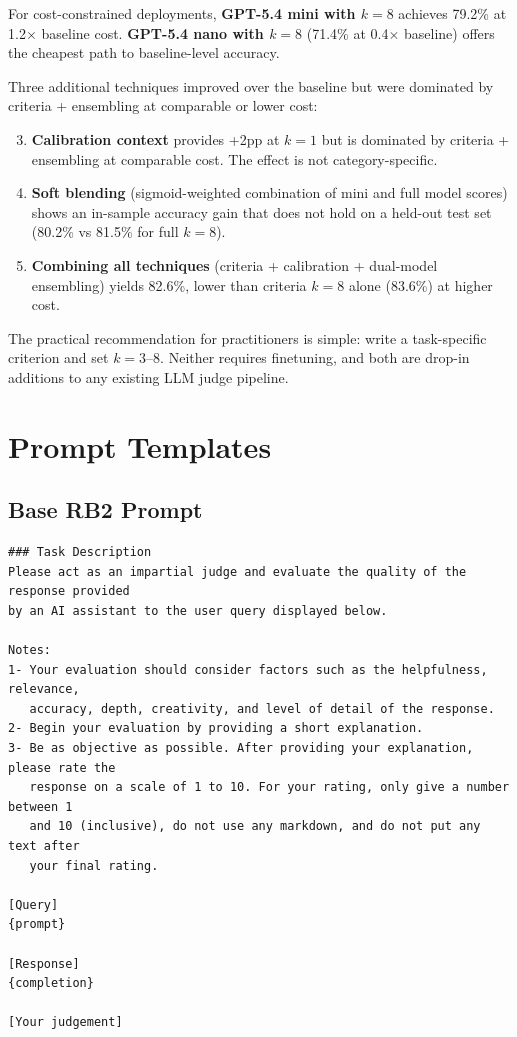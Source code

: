 \documentclass{article}
\begin{document}
For cost-constrained deployments, \textbf{GPT-5.4 mini with $k{=}8$} achieves 79.2\% at 1.2$\times$ baseline cost. \textbf{GPT-5.4 nano with $k{=}8$} (71.4\% at 0.4$\times$ baseline) offers the cheapest path to baseline-level accuracy.

Three additional techniques improved over the baseline but were dominated by criteria + ensembling at comparable or lower cost:

\begin{enumerate}
  \setcounter{enumi}{2}
  \item \textbf{Calibration context} provides +2pp at $k{=}1$ but is dominated by criteria + ensembling at comparable cost. The effect is not category-specific.
  \item \textbf{Soft blending} (sigmoid-weighted combination of mini and full model scores) shows an in-sample accuracy gain that does not hold on a held-out test set (80.2\% vs 81.5\% for full $k{=}8$).
  \item \textbf{Combining all techniques} (criteria + calibration + dual-model ensembling) yields 82.6\%, lower than criteria $k{=}8$ alone (83.6\%) at higher cost.
\end{enumerate}

The practical recommendation for practitioners is simple: write a task-specific criterion and set $k{=}3$--$8$. Neither requires finetuning, and both are drop-in additions to any existing LLM judge pipeline.

\FloatBarrier



\appendix
\section{Prompt Templates}
\label{sec:prompts}

\subsection{Base RB2 Prompt}
\label{sec:prompt-base}

\begin{lstlisting}[style=prompt]
### Task Description
Please act as an impartial judge and evaluate the quality of the response provided
by an AI assistant to the user query displayed below.

Notes:
1- Your evaluation should consider factors such as the helpfulness, relevance,
   accuracy, depth, creativity, and level of detail of the response.
2- Begin your evaluation by providing a short explanation.
3- Be as objective as possible. After providing your explanation, please rate the
   response on a scale of 1 to 10. For your rating, only give a number between 1
   and 10 (inclusive), do not use any markdown, and do not put any text after
   your final rating.

[Query]
{prompt}

[Response]
{completion}

[Your judgement]
\end{lstlisting}
\end{document}
